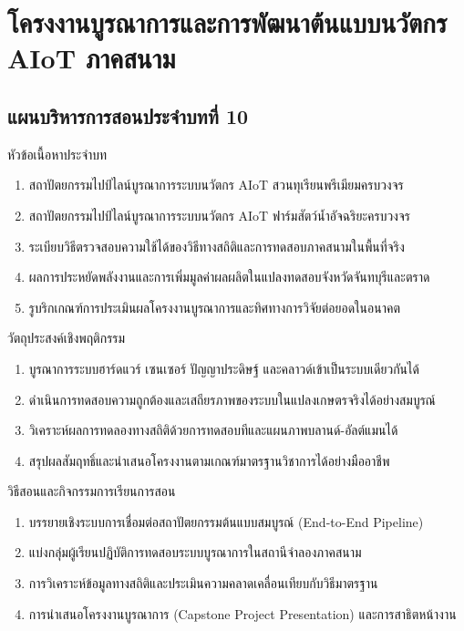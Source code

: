 \chapter{โครงงานบูรณาการและการพัฒนาต้นแบบนวัตกร AIoT ภาคสนาม}
\label{chap:ch10}

\section*{แผนบริหารการสอนประจำบทที่ 10}

\begin{planbox}{หัวข้อเนื้อหาประจำบท}
\begin{enumerate}[topsep=2pt, itemsep=1pt, partopsep=0pt, parsep=0pt, leftmargin=1.5em]
    \item สถาปัตยกรรมไปป์ไลน์บูรณาการระบบนวัตกร AIoT สวนทุเรียนพรีเมียมครบวงจร
    \item สถาปัตยกรรมไปป์ไลน์บูรณาการระบบนวัตกร AIoT ฟาร์มสัตว์น้ำอัจฉริยะครบวงจร
    \item ระเบียบวิธีตรวจสอบความใช้ได้ของวิธีทางสถิติและการทดสอบภาคสนามในพื้นที่จริง
    \item ผลการประหยัดพลังงานและการเพิ่มมูลค่าผลผลิตในแปลงทดสอบจังหวัดจันทบุรีและตราด
    \item รูบริกเกณฑ์การประเมินผลโครงงานบูรณาการและทิศทางการวิจัยต่อยอดในอนาคต
\end{enumerate}
\end{planbox}

\begin{planbox}{วัตถุประสงค์เชิงพฤติกรรม}
\begin{enumerate}[topsep=2pt, itemsep=1pt, partopsep=0pt, parsep=0pt, leftmargin=1.5em]
    \item บูรณาการระบบฮาร์ดแวร์ เซนเซอร์ ปัญญาประดิษฐ์ และคลาวด์เข้าเป็นระบบเดียวกันได้
    \item ดำเนินการทดสอบความถูกต้องและเสถียรภาพของระบบในแปลงเกษตรจริงได้อย่างสมบูรณ์
    \item วิเคราะห์ผลการทดลองทางสถิติด้วยการทดสอบทีและแผนภาพบลานด์-อัลต์แมนได้
    \item สรุปผลสัมฤทธิ์และนำเสนอโครงงานตามเกณฑ์มาตรฐานวิชาการได้อย่างมืออาชีพ
\end{enumerate}
\end{planbox}

\newpage

\begin{planbox}{วิธีสอนและกิจกรรมการเรียนการสอน}
\begin{enumerate}[topsep=2pt, itemsep=1pt, partopsep=0pt, parsep=0pt, leftmargin=1.5em]
    \item บรรยายเชิงระบบการเชื่อมต่อสถาปัตยกรรมต้นแบบสมบูรณ์ (End-to-End Pipeline)
    \item แบ่งกลุ่มผู้เรียนปฏิบัติการทดสอบระบบบูรณาการในสถานีจำลองภาคสนาม
    \item การวิเคราะห์ข้อมูลทางสถิติและประเมินความคลาดเคลื่อนเทียบกับวิธีมาตรฐาน
    \item การนำเสนอโครงงานบูรณาการ (Capstone Project Presentation) และการสาธิตหน้างาน
\end{enumerate}
\end{planbox}

